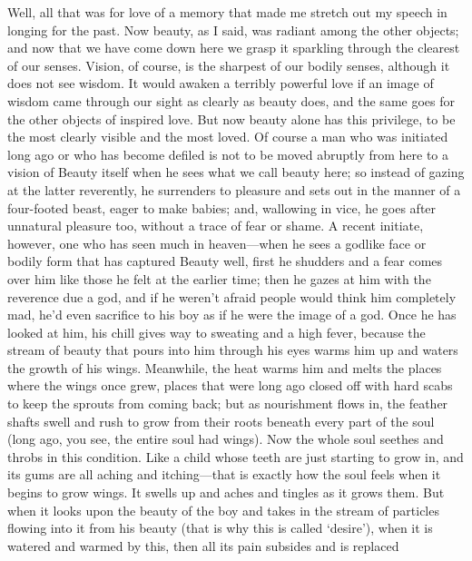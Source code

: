 Well, all that was for love of a memory that made me stretch out my 
speech in longing for the past. Now beauty, as I said, was
radiant among the other objects; and now that we have come down here we
grasp it sparkling through the clearest of our senses. Vision, of
course, is the sharpest of our bodily senses, although it does not see
wisdom. It would awaken a terribly powerful love if an image of wisdom
came through our sight as clearly as beauty does, and the same goes for
the other objects of inspired love. But now beauty alone has
this privilege, to be the most clearly visible and the most loved. Of
course a man who was initiated long ago or who has become defiled is not
to be moved abruptly from here to a vision of Beauty itself when he sees
what we call beauty here; so instead of gazing at the latter reverently,
he surrenders to pleasure and sets out in the manner of a four-footed
beast, eager to make babies; and, wallowing in vice, he 
goes after unnatural pleasure too, without a trace of fear or shame. A
recent initiate, however, one who has seen much in heaven---when he sees
a godlike face or bodily form that has captured Beauty well, first he
shudders and a fear comes over him like those he felt at the earlier
time; then he gazes at him with the reverence due a god, and if he
weren’t afraid people would think him completely mad, he’d even
sacrifice to his boy as if he were the image of a god. Once he
has looked at him, his chill gives way to sweating and a high fever,
because the stream of beauty that pours into him through his eyes warms
him up and waters the growth of his wings. Meanwhile, the heat warms him
and melts the places where the wings once grew, places that were long
ago closed off with hard scabs to keep the sprouts from coming back; but
as nourishment flows in, the feather shafts swell and rush to grow from
their roots beneath every part of the soul (long ago, you see, the
entire soul had wings). Now the whole soul seethes and throbs in
this condition. Like a child whose teeth are just starting to grow in,
and its gums are all aching and itching---that is exactly how the soul
feels when it begins to grow wings. It swells up and aches and tingles
as it grows them. But when it looks upon the beauty of the boy and takes
in the stream of particles flowing into it from his beauty (that is why
this is called
‘desire’), when it is
watered and warmed by this, then all its pain subsides and is replaced
